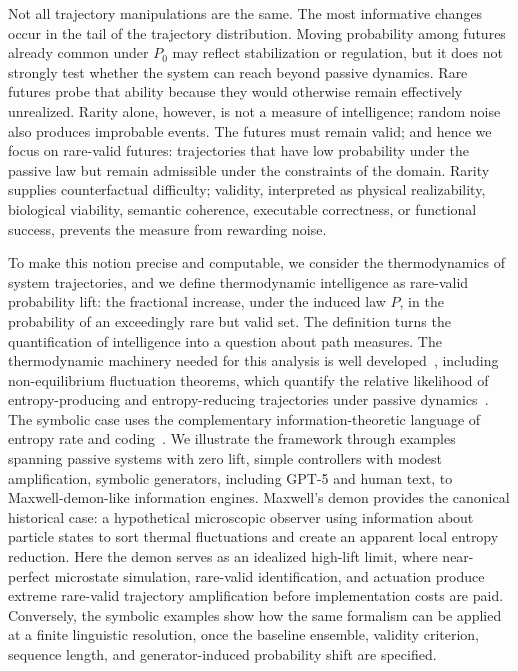 \documentclass[
  aps,
  prresearch,
  reprint,
  amsmath,
  amssymb,
  superscriptaddress,
  nofootinbib,
  longbibliography
]{revtex4-2}
\begin{document}
Not all trajectory manipulations are the same. The most informative changes occur in the tail of the trajectory distribution. Moving probability among futures already common under \(P_0\) may reflect stabilization or regulation, but it does not strongly test whether the system can reach beyond passive dynamics. Rare futures probe that ability because they would otherwise remain effectively unrealized. Rarity alone, however, is not a measure of intelligence; random noise also produces improbable events. The futures must remain valid; and hence we focus on rare-valid futures: trajectories that have low probability under the passive law but remain admissible under the constraints of the domain. Rarity supplies counterfactual difficulty; validity, interpreted as physical realizability, biological viability, semantic coherence, executable correctness, or functional success, prevents the measure from rewarding noise.

To make this notion precise and computable, we consider the thermodynamics of system trajectories, and we define  thermodynamic intelligence as rare-valid probability lift: the fractional increase, under the induced law \(P\), in the probability of an exceedingly rare but valid set. The definition turns the quantification of intelligence into a question about path measures. The thermodynamic machinery needed for this analysis is well developed~\citep{landauer1961irreversibility,bennett1982thermodynamics,sagawa2010generalized,parrondo2015thermodynamics,mandal2012work}, including non-equilibrium fluctuation theorems, which quantify the relative likelihood of entropy-producing and entropy-reducing trajectories under passive dynamics~\citep{evans1993probability,jarzynski1997nonequilibrium,crooks1999entropy,seifert2005entropy}. The symbolic case uses the complementary information-theoretic language of entropy rate and coding~\citep{shannon1948mathematical,coverthomas2006elements}. We illustrate the framework through examples spanning passive systems with zero lift, simple controllers with modest amplification,  symbolic generators, including GPT-5 and human text, to Maxwell-demon-like information engines.
Maxwell's demon provides  the canonical historical case: a hypothetical microscopic observer using information about particle states to sort thermal fluctuations and create an apparent local entropy reduction. Here the demon serves as an idealized high-lift limit, where near-perfect microstate simulation, rare-valid identification, and actuation produce extreme rare-valid trajectory amplification before implementation costs are paid. Conversely, the symbolic examples show how the same formalism can be applied at a finite linguistic resolution, once the baseline ensemble, validity criterion, sequence length, and generator-induced probability shift are specified.
\end{document}
